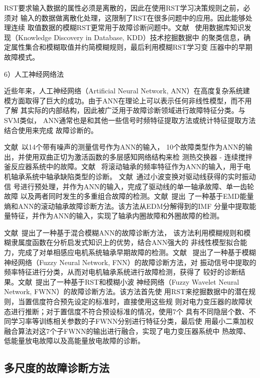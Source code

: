 RST要求输入数据的属性必须是离散的，因此在使用RST学习决策规则之前，必须对
输入的数据做离散化处理，这限制了RST在很多问题中的应用。因此能够处理连续
取值数据的模糊RST更常用于故障诊断问题中。文献~
使用数据库知识发现（Knowledge Discovery in Database, KDD）技术挖掘数据中
的聚类信息，确定属性集合和模糊取值并约简模糊规则，最后利用模糊RST学习变
压器中的早期故障模式。

6）人工神经网络法

近些年来，人工神经网络（Artificial Neural Network, ANN）在高度复杂系统建
模方面取得了巨大的成功。由于ANN在理论上可以表示任何非线性模型，而不用了解
其实际的内部结构，因此被广泛用于故障诊断领域进行故障特征分类。与SVM类似，
ANN通常也是和其他一些信号时频特征提取方法或统计特征提取方法结合使用来完成
故障诊断的。

文献~以14个带有噪声的测量信号作为ANN的输入，
10个故障类型作为ANN的输出，并使用双曲正切为激活函数的多层感知网络结构来检
测热交换器 - 连续搅拌釜反应器系统中的故障。文献~
将滚动轴承的频率特征作为ANN的输入，用于电机轴承系统中轴承缺陷类型的诊断。
文献~通过小波变换对驱动线获得的实时振动信
号进行预处理，并作为ANN的输入，完成了驱动线的单一轴承故障、单一齿轮故障
以及两者同时发生的多重组合故障的检测。文献~提出
了一种基于EMD能量熵和ANN的滚动轴承故障诊断方法。该方法从EDM分解得到的IMF
分量中提取能量特征，并作为ANN的输入，实现了轴承内圈故障和外圈故障的检测。

文献~提出了一种基于混合模糊ANN的故障诊断方法，
该方法利用模糊规则和模糊隶属度函数在分析启发式知识上的优势，结合ANN强大的
非线性模型拟合能力，完成了对单相感应电机系统轴承早期故障的检测。文献~
提出了一种基于模糊神经网络（Fuzzy Neural Network, FNN）的故障诊断方法，对
振动信号中提取的频率特征进行分类，从而对电机轴承系统进行故障检测，获得了
较好的诊断结果。文献~提出了一种基于RST和模糊小波
神经网络（Fuzzy Wavelet Neural Network, FWNN）的故障诊断方法。该方法首先使
用RST来挖掘数据中的潜在规则，当置信度符合预先设定的标准时，直接使用这些规
则对电力变压器的故障状态进行推断；对于置信度不符合预设标准的情况，使用7个
具有不同隐层个数、不同学习率等训练相关参数的子FWNN分别进行特征分类，最后使
用最小二乘加权融合算法对这7个子FWNN的输出进行融合，实现了电力变压器系统中
热故障、低能量放电故障以及高能量放电故障的诊断。

\subsection{多尺度的故障诊断方法}
\label{subsection:multiscale_methods}

